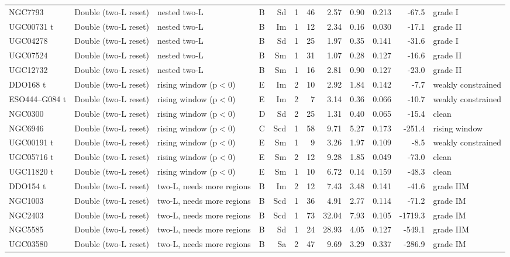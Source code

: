 \documentclass[10pt]{article}
\begin{document}
\begin{landscape}
{\begin{longtable}{llllrrrrrrrl}
NGC7793 & Double (two-L reset) & nested two-L & B & Sd & 1 & 46 & 2.57 & 0.90 & 0.213 & -67.5 & grade I\\
UGC00731 t & Double (two-L reset) & nested two-L & B & Im & 1 & 12 & 2.34 & 0.16 & 0.030 & -17.1 & grade II\\
UGC04278 & Double (two-L reset) & nested two-L & B & Sd & 1 & 25 & 1.97 & 0.35 & 0.141 & -31.6 & grade I\\
UGC07524 & Double (two-L reset) & nested two-L & B & Sm & 1 & 31 & 1.07 & 0.28 & 0.127 & -16.6 & grade II\\
UGC12732 & Double (two-L reset) & nested two-L & B & Sm & 1 & 16 & 2.81 & 0.90 & 0.127 & -23.0 & grade II\\
DDO168 t & Double (two-L reset) & rising window (p$<$0) & E & Im & 2 & 10 & 2.92 & 1.84 & 0.142 & -7.7 & weakly constrained\\
ESO444--G084 t & Double (two-L reset) & rising window (p$<$0) & E & Im & 2 & 7 & 3.14 & 0.36 & 0.066 & -10.7 & weakly constrained\\
NGC0300 & Double (two-L reset) & rising window (p$<$0) & D & Sd & 2 & 25 & 1.31 & 0.40 & 0.065 & -15.4 & clean\\
NGC6946 & Double (two-L reset) & rising window (p$<$0) & C & Scd & 1 & 58 & 9.71 & 5.27 & 0.173 & -251.4 & rising window\\
UGC00191 t & Double (two-L reset) & rising window (p$<$0) & E & Sm & 1 & 9 & 3.26 & 1.97 & 0.109 & -8.5 & weakly constrained\\
UGC05716 t & Double (two-L reset) & rising window (p$<$0) & E & Sm & 2 & 12 & 9.28 & 1.85 & 0.049 & -73.0 & clean\\
UGC11820 t & Double (two-L reset) & rising window (p$<$0) & E & Sm & 1 & 10 & 6.72 & 0.14 & 0.159 & -48.3 & clean\\
DDO154 t & Double (two-L reset) & two-L, needs more regions & B & Im & 2 & 12 & 7.43 & 3.48 & 0.141 & -41.6 & grade IIM\\
NGC1003 & Double (two-L reset) & two-L, needs more regions & B & Scd & 1 & 36 & 4.91 & 2.77 & 0.114 & -71.2 & grade IM\\
NGC2403 & Double (two-L reset) & two-L, needs more regions & B & Scd & 1 & 73 & 32.04 & 7.93 & 0.105 & -1719.3 & grade IM\\
NGC5585 & Double (two-L reset) & two-L, needs more regions & B & Sd & 1 & 24 & 28.93 & 4.05 & 0.127 & -549.1 & grade IIM\\
UGC03580 & Double (two-L reset) & two-L, needs more regions & B & Sa & 2 & 47 & 9.69 & 3.29 & 0.337 & -286.9 & grade IM\\

\end{longtable}}
\end{landscape}
\end{document}
